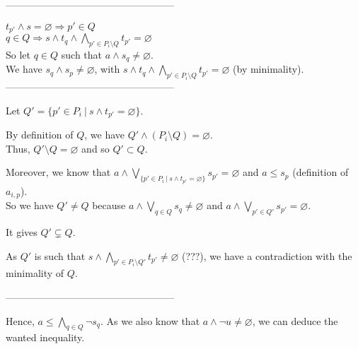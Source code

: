 \documentclass[a4paper]{article}%
\newcommand{\alt}{~|~}
\begin{document}
    ---------------------------------------------------

    $t_{p'} \land s = \varnothing \Rightarrow p' \in Q$\\
    $q \in Q \Rightarrow  s \land t_q \land \bigwedge_{p' \in P_i\setminus Q} t_{p'} = \varnothing$\\

    So let $q \in Q$ such that $a \land s_q \neq \varnothing$.\\
    We have $s_q \land s_p \neq \varnothing$, with $s \land t_q \land \bigwedge_{p' \in P_i\setminus Q} t_{p'} = \varnothing$ (by minimality).\\

    ---------------------------------------------------

    Let $Q' = \{p'\in P_i\alt s\wedge t_{p'}=\varnothing\}$.

    By definition of $Q$, we have $Q' \land (P_i \setminus Q) = \varnothing$.\\
    Thus, $Q' \setminus Q = \varnothing$ and so $Q' \subset Q$.

    Moreover, we know that $a \land \bigvee_{\{p'\in P_i\alt s\wedge t_{p'}=\varnothing\}} s_{p'} = \varnothing$ and $a \leq s_p$ (definition of $a_{i,p}$).\\
    So we have $Q' \neq Q$ because $a \land \bigvee_{q\in Q} s_q \neq \varnothing$ and $a \land \bigvee_{p'\in Q'} s_{p'} = \varnothing$.

    It gives $Q' \subsetneq Q$.

    As $Q'$ is such that $s \land \bigwedge_{p' \in P_i\setminus Q'} t_{p'} \neq \varnothing$ (???), we have a contradiction with the minimality of $Q$.

    ---------------------------------------------------

    Hence, $a \leq \bigwedge_{q\in Q} \neg s_q$. As we also know that $a \land \neg u \neq \varnothing$, we can deduce the wanted inequality.
\end{document}
